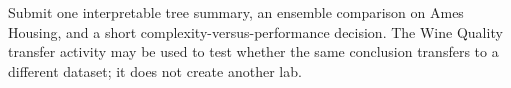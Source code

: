 \begin{labdeliverable}
Submit one interpretable tree summary, an ensemble comparison on Ames Housing, and a short complexity-versus-performance decision. The Wine Quality transfer activity may be used to test whether the same conclusion transfers to a different dataset; it does not create another lab.
\end{labdeliverable}
